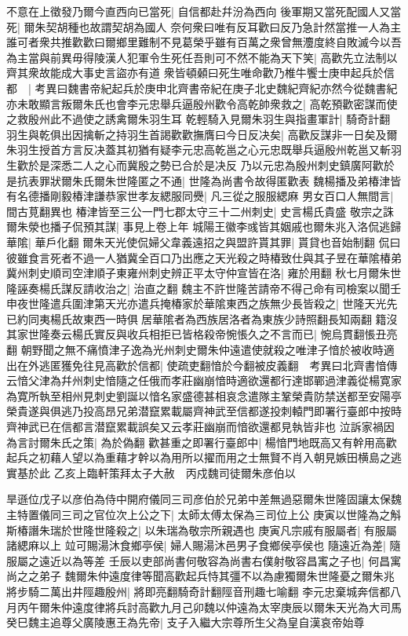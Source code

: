 不意在上徵發乃爾今直西向已當死|{
	自信都赴幷汾為西向}
後軍期又當死配國人又當死|{
	爾朱契胡種也故謂契胡為國人}
奈何衆曰唯有反耳歡曰反乃急計然當推一人為主誰可者衆共推歡歡曰爾鄉里難制不見葛榮乎雖有百萬之衆曾無灋度終自敗滅今以吾為主當與前異毋得陵漢人犯軍令生死任吾則可不然不能為天下笑|{
	高歡先立法制以齊其衆故能成大事史言盜亦有道}
衆皆頓顙曰死生唯命歡乃椎牛饗士庚申起兵於信都　|{
	考異曰魏書帝紀起兵於庚申北齊書帝紀在庚子北史魏紀齊紀亦然今從魏書紀}
亦未敢顯言叛爾朱氏也會李元忠舉兵逼殷州歡令高乾帥衆救之|{
	高乾預歡密謀而使之救殷州此不過使之誘禽爾朱羽生耳}
乾輕騎入見爾朱羽生與指畫軍計|{
	騎奇計翻}
羽生與乾俱出因擒斬之持羽生首謁歡歡撫膺曰今日反决矣|{
	高歡反謀非一日矣及爾朱羽生授首方言反决蓋其初猶有疑李元忠高乾邕之心元忠既舉兵逼殷州乾邕又斬羽生歡於是深悉二人之心而冀殷之勢已合於是决反}
乃以元忠為殷州刺史鎮廣阿歡於是抗表罪狀爾朱氏爾朱世隆匿之不通|{
	世隆為尚書令故得匿歡表}
魏楊播及弟椿津皆有名德播剛毅椿津謙恭家世孝友緦服同㸑|{
	凡三從之服服緦麻}
男女百口人無間言|{
	間古莧翻異也}
椿津皆至三公一門七郡太守三十二州刺史|{
	史言楊氏貴盛}
敬宗之誅爾朱滎也播子侃預其謀|{
	事見上卷上年}
城陽王徽李彧皆其姻戚也爾朱兆入洛侃逃歸華隂|{
	華戶化翻}
爾朱天光使侃婦父韋義遠招之與盟許貰其罪|{
	貰貸也音始制翻}
侃曰彼雖食言死者不過一人猶冀全百口乃出應之天光殺之時椿致仕與其子昱在華隂椿弟冀州刺史順司空津順子東雍州刺史辨正平太守仲宣皆在洛|{
	雍於用翻}
秋七月爾朱世隆誣奏楊氏謀反請收治之|{
	治直之翻}
魏主不許世隆苦請帝不得己命有司檢案以聞壬申夜世隆遣兵圍津第天光亦遣兵掩椿家於華隂東西之族無少長皆殺之|{
	世隆天光先已約同夷楊氏故東西一時俱居華隂者為西族居洛者為東族少詩照翻長知兩翻}
籍沒其家世隆奏云楊氏實反與收兵相拒已皆格殺帝惋悵久之不言而已|{
	惋烏貫翻悵丑亮翻}
朝野聞之無不痛憤津子逸為光州刺史爾朱仲遠遣使就殺之唯津子愔於被收時適出在外逃匿獲免往見高歡於信都|{
	使疏吏翻愔於今翻被皮義翻　考異曰北齊書愔傳云愔父津為幷州刺史愔隨之任俄而孝莊幽崩愔時適欲還都行達邯鄲過津義從楊寛家為寛所執至相州見刺史劉誕以愔名家盛德甚相哀念遣隊主鞏榮貴防禁送都至安陽亭榮貴遂與俱逃乃投高昂兄弟潜竄累載屬齊神武至信都遂投刺轅門即署行臺郎中按時齊神武已在信都言潜竄累載誤矣又云孝莊幽崩而愔欲還都見執皆非也}
泣訴家禍因為言討爾朱氏之策|{
	為於偽翻}
歡甚重之即署行臺郎中|{
	楊愔門地既高又有幹用高歡起兵之初藉人望以為重藉才幹以為用所以擢而用之士無賢不肖入朝見嫉田横島之逃實基於此}
乙亥上臨軒策拜太子大赦　丙戍魏司徒爾朱彦伯以

旱遜位戊子以彦伯為侍中開府儀同三司彦伯於兄弟中差無過惡爾朱世隆固讓太保魏主特置儀同三司之官位次上公之下|{
	太師太傅太保為三司位上公}
庚寅以世隆為之斛斯椿譖朱瑞於世隆世隆殺之|{
	以朱瑞為敬宗所親遇也}
庚寅凡宗戚有服屬者|{
	有服屬諸緦麻以上}
竝可賜湯沐食鄉亭侯|{
	婦人賜湯沐邑男子食鄉侯亭侯也}
隨遠近為差|{
	隨服屬之遠近以為等差}
壬辰以吏部尚書何敬容為尚書右僕射敬容昌㝢之子也|{
	何昌寓尚之之弟子}
魏爾朱仲遠度律等聞高歡起兵恃其彊不以為慮獨爾朱世隆憂之爾朱兆將步騎二萬出井陘趣殷州|{
	將即亮翻騎奇計翻陘音刑趣七喻翻}
李元忠棄城奔信都八月丙午爾朱仲遠度律將兵討高歡九月己卯魏以仲遠為太宰庚辰以爾朱天光為大司馬　癸巳魏主追尊父廣陵惠王為先帝|{
	支子入繼大宗尊所生父為皇自漢哀帝始尊}


